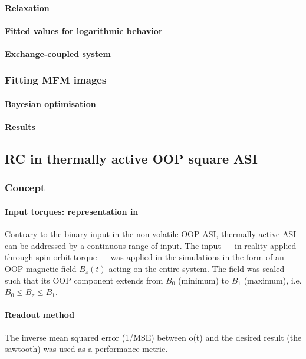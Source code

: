 \paragraph{Relaxation}
\paragraph{Fitted values for logarithmic behavior}
\paragraph{Exchange-coupled system} %
\subsubsection{Fitting MFM images}\label{sec:3:OOP:MFM}
\paragraph{Bayesian optimisation}
\paragraph{Results} %

\subsection{RC in thermally active OOP square ASI}
\subsubsection{Concept} %
\paragraph{Input torques: representation in \hotspice}
Contrary to the binary input in the non-volatile OOP ASI, thermally active ASI can be addressed by a continuous range of input.
The input --- in reality applied through spin-orbit torque --- was applied in the simulations in the form of an OOP magnetic field $B_z(t)$ acting on the entire system.
The field was scaled such that its OOP component extends from $B_0$ (minimum) to $B_1$ (maximum), i.e. $B_0 \leq B_z \leq B_1$.

\paragraph{Readout method}
The inverse mean squared error (1/MSE) between o(t) and the desired result (the sawtooth) was used as a performance metric.

